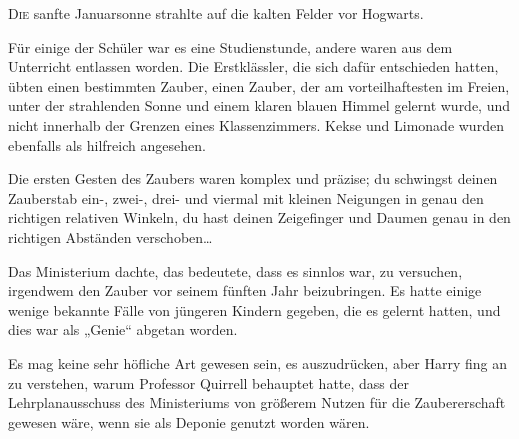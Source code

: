 
\lettrine{D}{ie} sanfte Januarsonne strahlte auf die kalten Felder vor Hogwarts.

Für einige der Schüler war es eine Studienstunde, andere waren aus dem Unterricht entlassen worden. Die Erstklässler, die sich dafür entschieden hatten, übten einen bestimmten Zauber, einen Zauber, der am vorteilhaftesten im Freien, unter der strahlenden Sonne und einem klaren blauen Himmel gelernt wurde, und nicht innerhalb der Grenzen eines Klassenzimmers. Kekse und Limonade wurden ebenfalls als hilfreich angesehen.

Die ersten Gesten des Zaubers waren komplex und präzise; du schwingst deinen Zauberstab ein-, zwei-, drei- und viermal mit kleinen Neigungen in genau den richtigen relativen Winkeln, du hast deinen Zeigefinger und Daumen genau in den richtigen Abständen verschoben…

Das Ministerium dachte, das bedeutete, dass es sinnlos war, zu versuchen, irgendwem den Zauber vor seinem fünften Jahr beizubringen. Es hatte einige wenige bekannte Fälle von jüngeren Kindern gegeben, die es gelernt hatten, und dies war als „Genie“ abgetan worden.

Es mag keine sehr höfliche Art gewesen sein, es auszudrücken, aber Harry fing an zu verstehen, warum Professor Quirrell behauptet hatte, dass der Lehrplanausschuss des Ministeriums von größerem Nutzen für die Zaubererschaft gewesen wäre, wenn sie als Deponie genutzt worden wären.


